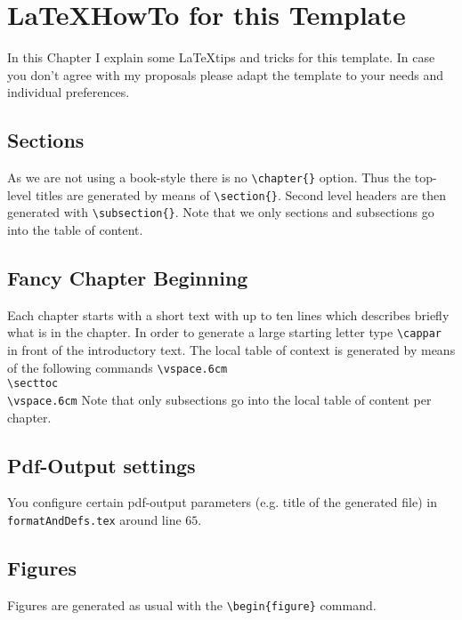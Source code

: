 \section{\LaTeX HowTo for this Template}
\label{sec:2}


\cappar In this Chapter I explain some \LaTeX tips and tricks for this template. In case you don't agree with my proposals please adapt the template to your needs and individual preferences.

\vspace{.6cm}
\secttoc
\vspace{.6cm}

\subsection{Sections}
As we are not using a book-style there is no \texttt{\textbackslash chapter\{\}} option. Thus the top-level titles are generated by means of \texttt{\textbackslash section\{\}}. Second level headers are then generated with  \texttt{\textbackslash subsection\{\}}. Note that we only sections and subsections go into the table of content.

\subsection{Fancy Chapter Beginning}
Each chapter starts with a short text with up to ten lines which describes briefly what is in the chapter. In order to generate a large starting letter type \texttt{\textbackslash cappar} in front of the introductory text. The local table of context is generated by means of the following commands \newline \newline \texttt{\textbackslash vspace{.6cm} \\ \textbackslash secttoc \\ \textbackslash vspace{.6cm}} \newline \newline Note that only subsections go into the local table of content per chapter.

\subsection{Pdf-Output settings}
You configure certain pdf-output parameters (e.g. title of the generated file) in \texttt{formatAndDefs.tex} around line $65$.

\subsection{Figures}
Figures are generated as usual with the \texttt{\textbackslash begin\{figure\}} command.

